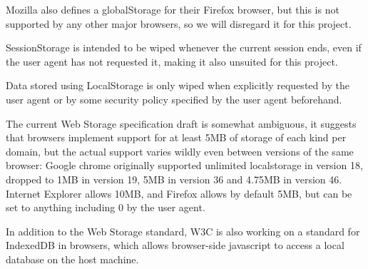 Mozilla also defines a globalStorage for their Firefox browser, 
but this is not supported by any other major browsers, so we will disregard it for this project.

SessionStorage is intended to be wiped whenever the current session ends, 
even if the user agent has not requested it, making it also unsuited for this project.

Data stored using LocalStorage is only wiped when explicitly requested by the user agent or 
by some security policy specified by the user agent beforehand.
\newline

The current Web Storage specification draft is somewhat ambiguous, 
it suggests that browsers implement support for at least 5MB of storage of each kind per domain,
but the actual support varies wildly even between versions of the same browser:
Google chrome originally supported unlimited localstorage in version 18, dropped to 1MB in version 19, 
5MB in version 36 and 4.75MB in version 46. 
Internet Explorer allows 10MB, 
and Firefox allows by default 5MB, but can be set to anything including 0 by the user agent.
\newline

In addition to the Web Storage standard, W3C is also working on a standard for IndexedDB in browsers, 
which allows browser-side javascript to access a local database on the host machine.
\newline
